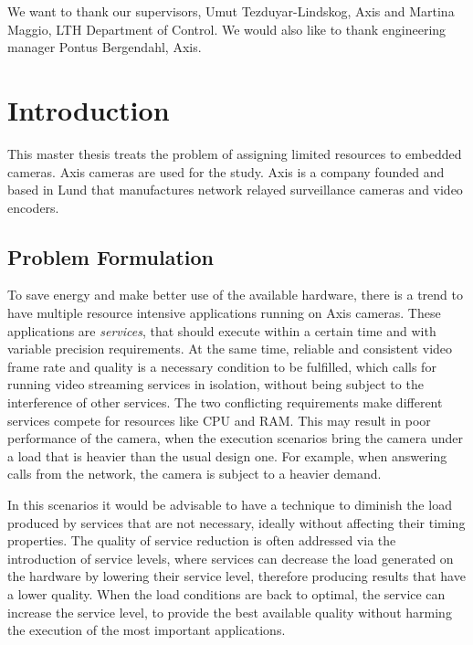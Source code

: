 \documentclass[nobiblatex]{LTHthesis}
\begin{document}
We want to thank our supervisors, Umut Tezduyar-Lindskog, Axis and Martina 
Maggio, LTH Department of Control. We would also like to thank engineering 
manager Pontus Bergendahl, Axis.

\newpage

\tableofcontents
\newpage

\setcounter{page}{1}

\chapter{Introduction}

This master thesis treats the problem of assigning limited resources to
embedded cameras. Axis cameras are used for the study. Axis is a company
founded and based in Lund that manufactures network relayed surveillance
cameras and video encoders.

\section{Problem Formulation}

To save energy and make better use of the available hardware, there is a
trend to have multiple resource intensive applications running on Axis
cameras. These applications are \emph{services}, that should execute within
a certain time and with variable precision requirements. At the same time,
reliable and consistent video frame rate and quality is a necessary
condition to be fulfilled, which calls for running video streaming
services in isolation, without being subject to the interference of
other services. The two conflicting requirements make different services 
compete for resources like CPU and RAM. This may result in poor performance 
of the camera, when the execution scenarios bring the camera under a load
that is heavier than the usual design one. For example, when answering calls
from the network, the camera is subject to a heavier demand. 

In this scenarios it would be advisable to have a technique to diminish
the load produced by services that are not necessary, ideally without
affecting their timing properties. The quality of service reduction is
often addressed via the introduction of service levels, where services can
decrease the load generated on the hardware by lowering their service level,
therefore producing results that have a lower quality. When the load
conditions are back to optimal, the service can increase the service level,
to provide the best available quality without harming the execution of the
most important applications.
\end{document}
